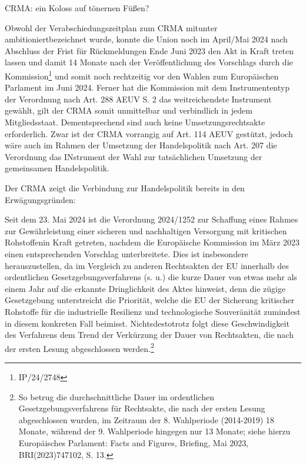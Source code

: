 \documentclass[12pt,a4paper,oneside]{book} %
\begin{document}
CRMA: ein Koloss auf tönernen Füßen?


Obwohl der Verabschiedungszeitplan zum CRMA mitunter \glqq ambitioniert\grqq bezeichnet wurde, konnte die Union noch im April/Mai 2024 nach Abschluss der Frist für Rückmeldungen Ende Juni 2023 den Akt in Kraft treten lassen und damit 14 Monate nach der Veröffentlichung des Vorschlags durch die Kommission\footnote{IP/24/2748} und somit noch rechtzeitig vor den Wahlen zum Europäischen Parlament im Juni 2024. Ferner hat die Kommission mit dem Instrumententyp der Verordnung nach Art. 288 AEUV S. 2 das weitreichendste Instrument gewählt, gilt der CRMA somit unmittelbar und verbindlich in jedem Mitgliedsstaat. Dementsprechend sind auch keine Umsetzungsrechtsakte erforderlich. Zwar ist der CRMA vorrangig auf Art. 114 AEUV gestützt, jedoch wäre auch im Rahmen der Umsetzung der Handelspolitik nach Art. 207 die Verordnung das INstrument der Wahl zur tatsächlichen Umsetzung der gemeinsamen Handelspolitik.\autocite{RdTW 2024, 216}

Der CRMA zeigt die Verbindung zur Handelspolitik bereits in den Erwägungsgründen: 



Seit dem 23. Mai 2024 ist die Verordnung 2024/1252 \glqq zur Schaffung eines Rahmes zur Gewährleistung einer sicheren und nachhaltigen Versorgung mit kritischen Rohstoffen\grqq in Kraft getreten, nachdem die Europäische Kommission im März 2023 einen entsprechenden Vorschlag unterbreitete. Dies ist insbesondere herauszustellen, da im Vergleich zu anderen Rechtsakten der EU innerhalb des ordentlichen Gesetzgebungsverfahrens (s. u.) die kurze Dauer von etwas mehr als einem Jahr auf die erkannte Dringlichkeit des Aktes hinweist, denn die zügige Gesetzgebung unterstreicht die Priorität, welche die EU der Sicherung kritischer Rohstoffe für die industrielle Resilienz und technologische Souveränität zumindest in diesem konkreten Fall beimisst. Nichtsdestotrotz folgt diese Geschwindigkeit des Verfahrens dem Trend der Verkürzung der Dauer von Rechtsakten, die nach der ersten Lesung abgeschlossen werden.\footnote{So betrug die durchschnittliche Dauer im ordentlichen Gesetzgebungsverfahrens für Rechtsakte, die nach der ersten Lesung abgeschlossen wurden, im Zeitraum der 8. Wahlperiode (2014-2019) 18 Monate, während der 9. Wahlperiode hingegen nur 13 Monate; siehe hierzu Europäisches Parlament: Facts and Figures, Briefing, Mai 2023, BRI(2023)747102, S. 13.} 
\end{document}
